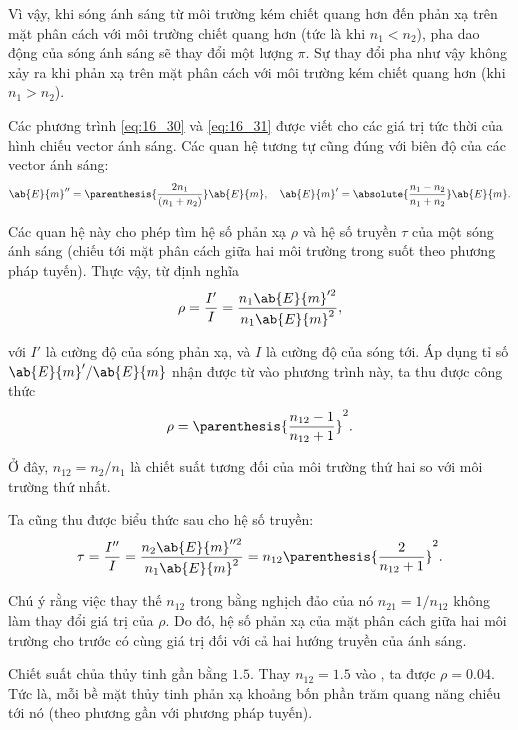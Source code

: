 Vì vậy, khi sóng ánh sáng từ môi trường kém chiết quang hơn đến phản xạ trên mặt phân cách với môi trường chiết quang hơn (tức là khi $n_1 < n_2$), pha dao động của sóng ánh sáng sẽ thay đổi một lượng $\pi$.
Sự thay đổi pha như vậy không xảy ra khi phản xạ trên mặt phân cách với môi trường kém chiết quang hơn (khi $n_1 > n_2$).

Các phương trình \eqref{eq:16_30} và \eqref{eq:16_31} được viết cho các giá trị tức thời của hình chiếu vector ánh sáng.
Các quan hệ tương tự cũng đúng với biên độ của các vector ánh sáng:
\begin{equation}\label{eq:16_32}
    \ab{E}{m}'' = \parenthesis{\frac{2 n_1}{(n_1 + n_2)}} \ab{E}{m},\quad \ab{E}{m}' = \absolute{\frac{n_1 - n_2}{n_1 + n_2}} \ab{E}{m}.
\end{equation}

\noindent
Các quan hệ này cho phép tìm hệ số phản xạ $\rho$ và hệ số truyền $\tau$ của một sóng ánh sáng (chiếu tới mặt phân cách giữa hai môi trường trong suốt theo phương pháp tuyến).
Thực vậy, từ định nghĩa
\begin{equation*}
    \rho = \frac{I'}{I} = \frac{n_1 \ab{E}{m}'^2}{n_1 \ab{E}{m}^2},
\end{equation*}

\noindent
với $I'$ là cường độ của sóng phản xạ, và $I$ là cường độ của sóng tới.
Áp dụng tỉ số $\ab{E}{m}'/\ab{E}{m}$ nhận được từ  vào phương trình này, ta thu được công thức
\begin{equation}\label{eq:16_33}
    \rho = \parenthesis{\frac{n_{12} - 1}{n_{12} + 1}}^2.
\end{equation}

\noindent
Ở đây, $n_{12} = n_2/n_1$ là chiết suất tương đối của môi trường thứ hai so với môi trường thứ nhất.

Ta cũng thu được biểu thức sau cho hệ số truyền:
\begin{equation}\label{eq:16_34}
    \tau = \frac{I''}{I} = \frac{n_2 \ab{E}{m}''^2}{n_1 \ab{E}{m}^2} = n_{12} \parenthesis{\frac{2}{n_{12} + 1}}^2.
\end{equation}

Chú ý rằng việc thay thế $n_{12}$ trong  bằng nghịch đảo của nó $n_{21} = 1/n_{12}$ không làm thay đổi giá trị của $\rho$.
Do đó, hệ số phản xạ của mặt phân cách giữa hai môi trường cho trước có cùng giá trị đối với cả hai hướng truyền của ánh sáng.

Chiết suất chủa thủy tinh gần bằng $1.5$. Thay $n_{12} = 1.5$ vào , ta được $\rho = 0.04$.
Tức là, mỗi bề mặt thủy tinh phản xạ khoảng bốn phần trăm quang năng chiếu tới nó (theo phương gần với phương pháp tuyến).

